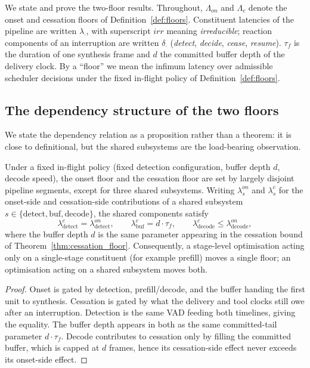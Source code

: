 We state and prove the two-floor results.
Throughout, $\Lambda_{on}$ and $\Lambda_c$ denote the onset and cessation floors of
Definition~\ref{def:floors}.
Constituent latencies of the pipeline are written $\lambda_{\cdot}$, with superscript $irr$
meaning \emph{irreducible}; reaction components of an interruption are written
$\delta_{\cdot}$ (\emph{detect}, \emph{decide}, \emph{cease}, \emph{resume}).
$\tau_f$ is the duration of one synthesis frame and $d$ the committed buffer depth of the
delivery clock.
By a ``floor'' we mean the infimum latency over admissible scheduler decisions under the fixed
in-flight policy of Definition~\ref{def:floors}.

\subsection{The dependency structure of the two floors}
We state the dependency relation as a proposition rather than a theorem: it is close to
definitional, but the shared subsystems are the load-bearing observation.

\begin{proposition}
\label{prop:floor_dependency}
Under a fixed in-flight policy (fixed detection configuration, buffer depth $d$, decode
speed), the onset floor and the cessation floor are set by largely disjoint pipeline
segments, except for three shared subsystems.
Writing $\lambda_s^{on}$ and $\lambda_s^{c}$ for the onset-side and cessation-side
contributions of a shared subsystem $s \in \{ \mathrm{detect}, \mathrm{buf},
\mathrm{decode} \}$, the shared components satisfy
\begin{equation}
  \lambda_{\mathrm{detect}}^{c} = \lambda_{\mathrm{detect}}^{on}, \qquad
  \lambda_{\mathrm{buf}}^{c} = d \cdot \tau_f, \qquad
  \lambda_{\mathrm{decode}}^{c} \leq \lambda_{\mathrm{decode}}^{on},
\end{equation}
where the buffer depth $d$ is the same parameter appearing in the cessation bound of
Theorem~\ref{thm:cessation_floor}.
Consequently, a stage-level optimisation acting only on a single-stage constituent (for
example prefill) moves a single floor; an optimisation acting on a shared subsystem moves
both.
\end{proposition}

\begin{proof}
Onset is gated by detection, prefill/decode, and the buffer handing the first unit to
synthesis.
Cessation is gated by what the delivery and tool clocks still owe after an interruption.
Detection is the same VAD feeding both timelines, giving the equality.
The buffer depth appears in both as the same committed-tail parameter $d \cdot \tau_f$.
Decode contributes to cessation only by filling the committed buffer, which is capped at $d$
frames, hence its cessation-side effect never exceeds its onset-side effect.
\end{proof}

